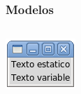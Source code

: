 \documentclass[12pt]{beamer}
\begin{document}
  \begin{frame}
    \frametitle{Modelos}
    \begin{columns}[B]
        \footnotesize
        
        \vspace{20ex}
        \includegraphics[width=\textwidth]{programas/tkinter/capturas/modelo.png}
    \end{columns}
  \end{frame}
\end{document}
